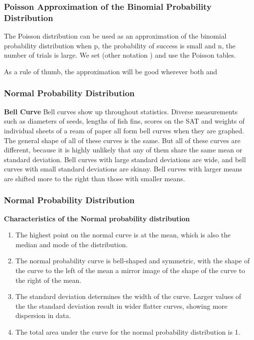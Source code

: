 \documentclass[IntroMain.tex]{subfiles}
\begin{document}
\begin{frame}
	\frametitle{Poisson Approximation of the Binomial Probability Distribution}

The Poisson distribution can be used  as an approximation of the binomial probability distribution when p, the probability of success is small and n, the number of trials is large.
We set   (other notation  )  and use the Poisson tables. 
 
As a rule of thumb, the approximation will be good wherever both  and  
 

\end{frame}
\begin{frame}
	\frametitle{Normal Probability Distribution}

\textbf{Bell Curve}
Bell curves show up throughout statistics. Diverse measurements such as diameters of seeds, lengths of fish fins, scores on the SAT and weights of individual sheets of a ream of paper all form bell curves when they are graphed. The general shape of all of these curves is the same. But all of these curves are different, because it is highly unlikely that any of them share the same mean or standard deviation. Bell curves with large standard deviations are wide, and bell curves with small standard deviations are skinny. Bell curves with larger means are shifted more to the right than those with smaller means.

\end{frame}
\begin{frame}
	\frametitle{Normal Probability Distribution}
\textbf{Characteristics of the Normal probability distribution}

\begin{enumerate}
\item The highest point on the normal curve is at the mean, which is also the median and mode of the distribution.

\item The normal probability curve is bell-shaped and symmetric, with the shape of the curve to the left of the mean a mirror image of the shape of the curve to the right of the mean.

\item The standard deviation determines the width of the curve. Larger values of the the standard deviation result in wider flatter curves, showing more dispersion in data.

\item The total area under the curve for the normal probability distribution is 1.
\end{enumerate}

\end{frame}
\end{document}
